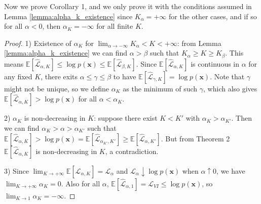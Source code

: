 Now we prove Corollary 1, and we only prove it with the conditions assumed in Lemma \ref{lemma:alpha_k_existence} since $K_{\alpha} = +\infty$ for the other cases, and if so for all $\alpha < 0$, then $\alpha_K = -\infty$ for all finite $K$.
\begin{proof}
 
1) Existence of $\alpha_K$ for $\lim_{\alpha \rightarrow -\infty} K_{\alpha} < K < +\infty$: from Lemma \ref{lemma:alpha_k_existence} we can find $\alpha > \beta$ such that $K_{\alpha} \geq K \geq K_{\beta}$. This means  $\mathbb{E}[\hat{\mathcal{L}}_{\alpha, K}] \leq \log p(\bm{x}) \leq \mathbb{E}[\hat{\mathcal{L}}_{\beta, K}]$. Since $\mathbb{E}[\hat{\mathcal{L}}_{\alpha, K}]$ is continuous in $\alpha$ for any fixed $K$, there exits $\alpha \leq \gamma \leq \beta$ to have $\mathbb{E}[\hat{\mathcal{L}}_{\gamma, K}] = \log p(\bm{x})$. Note that $\gamma$ might not be unique, so we define $\alpha_K$ as the minimum of such $\gamma$, which also gives $\mathbb{E} [ \hat{\mathcal{L}}_{\alpha, K} ] > \log p(\bm{x})$ for all $\alpha < \alpha_K$.

2) $\alpha_K$ is non-decreasing in $K$: suppose there exist $K < K'$ with $\alpha_K > \alpha_{K'}$. Then we can find $\alpha_K > \alpha > \alpha_{K'}$ such that $\mathbb{E}[\hat{\mathcal{L}}_{\alpha, K}] > \log p(\bm{x}) = \mathbb{E}[\hat{\mathcal{L}}_{\alpha_{K'}, K'}] \geq \mathbb{E}[\hat{\mathcal{L}}_{\alpha, K'}]$. But from Theorem 2 $\mathbb{E}[\hat{\mathcal{L}}_{\alpha, K}]$ is non-decreasing in $K$, a contradiction.

3) Since $\lim_{K \rightarrow +\infty} \mathbb{E}[\hat{\mathcal{L}}_{\alpha, K}] = \mathcal{L}_{\alpha}$ and $\mathcal{L}_{\alpha} \downarrow \log p(\bm{x})$ when $\alpha \uparrow 0$, we have $\lim_{K \rightarrow +\infty} \alpha_K = 0$. Also for all $\alpha$, $\mathbb{E}[\hat{\mathcal{L}}_{\alpha, 1}] = \mathcal{L}_{VI} \leq \log p(\bm{x})$, so $\lim_{K \rightarrow 1} \alpha_K = -\infty$.
 
\end{proof}